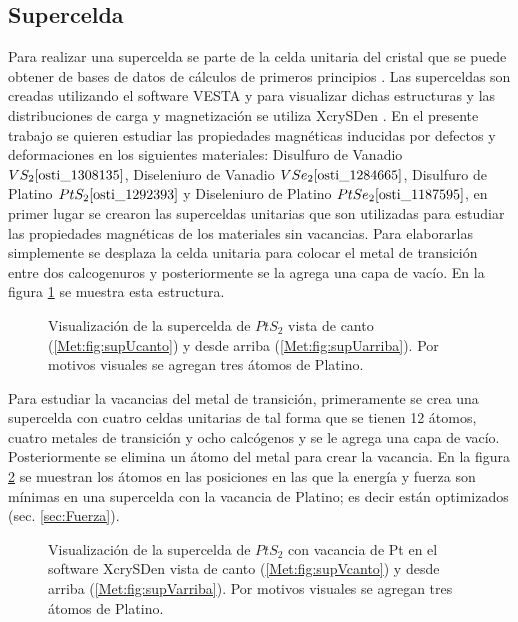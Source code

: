 \subsection{Supercelda}  \label{Met:subsec:supercelda}
Para realizar una supercelda se  parte de la  celda unitaria del cristal que se puede obtener de bases de datos  de c\'alculos de primeros principios \cite{Jain2013}. Las superceldas son creadas utilizando el software VESTA \cite{Momma:db5098} y para visualizar dichas estructuras y las distribuciones de carga y magnetizaci\'on se utiliza XcrySDen \cite{kokalj_1999}.  En el presente trabajo se quieren estudiar las propiedades magn\'eticas inducidas por defectos y deformaciones en los siguientes materiales: Disulfuro de Vanadio $VS_2  \cite{osti_1308135} $, Diseleniuro de Vanadio$~VSe_2 \cite{osti_1284665}$, Disulfuro de Platino$~PtS_2 \cite{osti_1292393}$ y Diseleniuro de Platino $PtSe_2 \cite{osti_1187595}$, en primer lugar se crearon las superceldas  unitarias que son utilizadas para estudiar las propiedades magn\'eticas de los materiales sin vacancias. Para elaborarlas simplemente se desplaza la celda unitaria  para colocar el metal de transici\'on entre dos calcogenuros y posteriormente se la agrega una capa de vac\'io. En la figura \ref{Met:fig:SupU} se muestra esta estructura. 
\begin{figure}[hbt!]
	\centering
    \caption[Supercelda de los materiales estudiados]{ Visualizaci\'on de la supercelda de $PtS_2$ vista de canto (\ref{Met:fig:supUcanto}) y desde arriba (\ref{Met:fig:supUarriba}). Por motivos visuales se agregan tres \'atomos de Platino.}
    \label{Met:fig:SupU}
\end{figure}   
\newline
\par  Para estudiar la vacancias del metal de transición, primeramente se crea una supercelda con cuatro celdas unitarias de tal forma que se tienen 12 \'atomos, cuatro metales de transici\'on y ocho calc\'ogenos y  se le agrega una capa de vac\'io. Posteriormente  se elimina un \'atomo del metal para crear la vacancia. En la figura \ref{Met:fig:SupV} se muestran los \'atomos en las posiciones en las que la energ\'ia y fuerza son m\'inimas en una supercelda con la vacancia de Platino; es decir est\'an optimizados (sec. \ref{sec:Fuerza}).
\begin{figure}[hbt!]
	\centering
	\caption[Estructura de la supercelda.]{ Visualizaci\'on de la supercelda de $PtS_2$  con vacancia de Pt en el software XcrySDen vista de canto (\ref{Met:fig:supVcanto}) y desde arriba (\ref{Met:fig:supVarriba}). Por motivos visuales se agregan tres \'atomos de Platino.}
	\label{Met:fig:SupV}
\end{figure}
